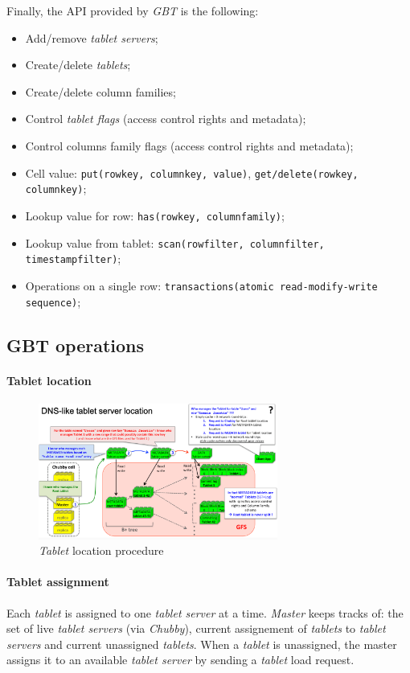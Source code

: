 \bigskip\noindent
Finally, the API provided by \emph{GBT} is the following:
\begin{itemize}
    \item Add/remove \emph{tablet servers};
    \item Create/delete \emph{tablets};
    \item Create/delete column families;
    \item Control \emph{tablet flags} (access control rights and metadata);
    \item Control columns family flags (access control rights and metadata);
    \item Cell value: \texttt{put(rowkey, columnkey, value)},
    \texttt{get/delete(rowkey, columnkey)};
    \item Lookup value for row: \texttt{has(rowkey, columnfamily)};
    \item Lookup value from tablet: \texttt{scan(rowfilter, columnfilter, timestampfilter)};
    \item Operations on a single row: \texttt{transactions(atomic read-modify-write sequence)};
\end{itemize}

\subsection{GBT operations}
\paragraph{Tablet location}\mbox{}

\begin{figure}[h!]
    \centering
    \includegraphics[width=0.7\textwidth]{images/gbt-tablet-location.png}
    \caption{\emph{Tablet} location procedure}
\end{figure}

\paragraph{Tablet assignment}
Each \emph{tablet} is assigned to one \emph{tablet server} at a time.
\emph{Master} keeps tracks of: the set of live \emph{tablet servers} (via
\emph{Chubby}), current assignement of \emph{tablets} to \emph{tablet servers}
and current unassigned \emph{tablets}. When a \emph{tablet} is unassigned, the
master assigns it to an available \emph{tablet server} by sending a \emph{tablet}
load request.

